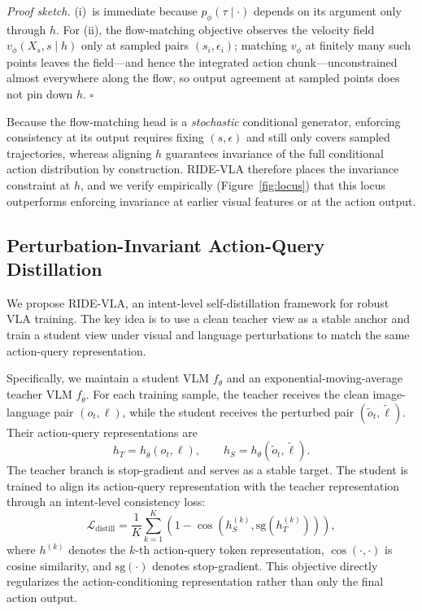 \documentclass[letterpaper]{article} %
\newcommand{\method}{\textsc{RIDE-VLA}}
\begin{document}
\noindent\textit{Proof sketch.}
(i)~is immediate because $p_\phi(\tau\mid\cdot)$ depends on its argument only through $h$.
For (ii), the flow-matching objective observes the velocity field $v_\phi(X_s,s\mid h)$ only at sampled pairs $(s_i,\epsilon_i)$; matching $v_\phi$ at finitely many such points leaves the field---and hence the integrated action chunk---unconstrained almost everywhere along the flow, so output agreement at sampled points does not pin down $h$. $\square$

Because the flow-matching head is a \emph{stochastic} conditional generator, enforcing consistency at its output requires fixing $(s,\epsilon)$ and still only covers sampled trajectories, whereas aligning $h$ guarantees invariance of the full conditional action distribution by construction. \method{} therefore places the invariance constraint at $h$, and we verify empirically (Figure~\ref{fig:locus}) that this locus outperforms enforcing invariance at earlier visual features or at the action output.

\subsection{Perturbation-Invariant Action-Query Distillation}

We propose \method, an intent-level self-distillation framework for robust VLA training. The key idea is to use a clean teacher view as a stable anchor and train a student view under visual and language perturbations to match the same action-query representation.

Specifically, we maintain a student VLM $f_\theta$ and an exponential-moving-average teacher VLM $f_{\bar{\theta}}$. For each training sample, the teacher receives the clean image-language pair $(o_t,\ell)$, while the student receives the perturbed pair $(\tilde{o}_t,\tilde{\ell})$. Their action-query representations are
\begin{equation}
    h_T =
    h_{\bar{\theta}}(o_t,\ell),
    \qquad
    h_S =
    h_{\theta}(\tilde{o}_t,\tilde{\ell}).
\end{equation}
The teacher branch is stop-gradient and serves as a stable target. The student is trained to align its action-query representation with the teacher representation through an intent-level consistency loss:
\begin{equation}
    \mathcal{L}_{\mathrm{distill}}
    =
    \frac{1}{K}
    \sum_{k=1}^{K}
    \left(
    1 -
    \cos
    \left(
    h_S^{(k)},
    \mathrm{sg}(h_T^{(k)})
    \right)
    \right),
\end{equation}
where $h^{(k)}$ denotes the $k$-th action-query token representation, $\cos(\cdot,\cdot)$ is cosine similarity, and $\mathrm{sg}(\cdot)$ denotes stop-gradient. This objective directly regularizes the action-conditioning representation rather than only the final action output.
\end{document}

